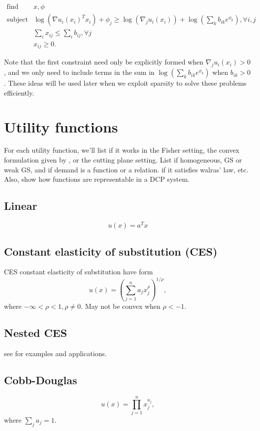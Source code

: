 \documentclass{article}
\begin{document}
\[
\begin{array}{ll}
\mbox{find} & x, \phi \\
\mbox{subject to} & \log(\nabla u_i(x_i)^T x_i) + \phi_j \geq  \log(\nabla_j u_i(x_i)) +  \log(\sum_k b_{ik} e^{\phi_k}), \forall i,j\\
& \sum_i x_{ij} \leq \sum_i b_{ij}, \forall j\\
& x_{ij} \geq 0.
\end{array}
\]

Note that the first constraint need only be explicitly formed when $\nabla_j u_i(x_i) > 0$, and we only need to include terms in the sum in
$\log(\sum_k b_{ik} e^{\phi_k})$ when $b_{ik} > 0$. These ideas will be used later when we exploit sparsity to solve these problems efficiently.

\section{Utility functions}
For each utility function, we'll list if it works in the Fisher setting, the convex formulation given by \cite{chen2010equilibrium}, or the cutting plane setting. List if homogeneous, GS or weak GS, and if demand is a function or a relation. if it satisfies walras' law, etc. Also, show how functions are representable in a DCP system.

\subsection{Linear}
\[
u(x) = a^T x
\]

\subsection{Constant elasticity of substitution (CES)}
CES constant elasticity of substitution have form
\[
u(x) = \left(\sum_{j=1}^n a_j x_j^\rho \right)^{1/\rho},
\]
where $-\infty < \rho < 1, \rho \neq 0$.
May not be convex when $\rho < -1$.

\subsection{Nested CES}
see \cite{shoven1992applying} for examples and applications.  

\subsection{Cobb-Douglas}
\[
u(x) = \prod_{j=1}^{n} x_j^{a_j},
\]
where $\sum_j a_j = 1$.
\end{document}
